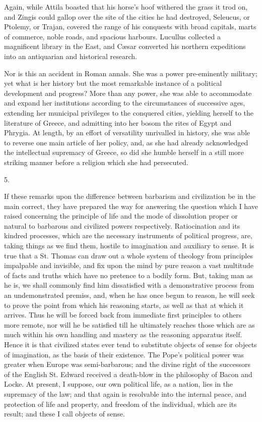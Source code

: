 Again, while Attila boasted
that his horse's hoof withered the grass it trod on, and Zingis could
gallop over the site of the cities he had destroyed, Seleucus, or
Ptolemy, or Trajan, covered the range of his conquests with broad
capitals, marts of commerce, noble roads, and spacious harbours.
Lucullus collected a magnificent library in the East, and Cæsar
converted his northern expeditions into an antiquarian and historical
research.

Nor is this an accident in
Roman annals. She was a power pre-eminently military; yet what is her
history but the most remarkable instance of a political development
and progress? More than any power, she was able to accommodate and
expand her institutions according to the circumstances of successive
ages, extending her municipal privileges to the conquered cities,
yielding herself to the literature of Greece, and admitting into her
bosom the rites of Egypt and Phrygia. At length, by an effort of
versatility unrivalled in history, she was able to reverse one main
article of her policy, and, as she had already acknowledged the
intellectual supremacy of Greece, so did she humble herself in a still
more striking manner before a religion which she had persecuted.

5.

If these remarks upon the
difference between barbarism and civilization be in the main correct,
they have prepared the way for answering the question which I have
raised concerning the principle of life and the mode of dissolution
proper or natural to barbarous and civilized powers
respectively. Ratiocination and its kindred processes, which are the
necessary instruments of political progress, are, taking things as we
find them, hostile to imagination and auxiliary to sense. It is true
that a St. Thomas can draw out a whole system of theology from
principles impalpable and invisible, and fix upon the mind by pure
reason a vast multitude of facts and truths which have no pretence to
a bodily form. But, taking man as he is, we shall commonly find him
dissatisfied with a demonstrative process from an undemonstrated
premiss, and, when he has once begun to reason, he will seek to prove
the point from which his reasoning starts, as well as that at which it
arrives. Thus he will be forced back from immediate first principles
to others more remote, nor will he be satisfied till he ultimately
reaches those which are as much within his own handling and mastery as
the reasoning apparatus itself. Hence it is that civilized states ever
tend to substitute objects of sense for objects of imagination, as the
basis of their existence. The Pope's political power was greater when
Europe was semi-barbarous; and the divine right of the successors of
the English St. Edward received a death-blow in the philosophy of
Bacon and Locke. At present, I suppose, our own political life, as a
nation, lies in the supremacy of the law; and that again is resolvable
into the internal peace, and protection of life and property, and
freedom of the individual, which are its result; and these I call
objects of sense.

